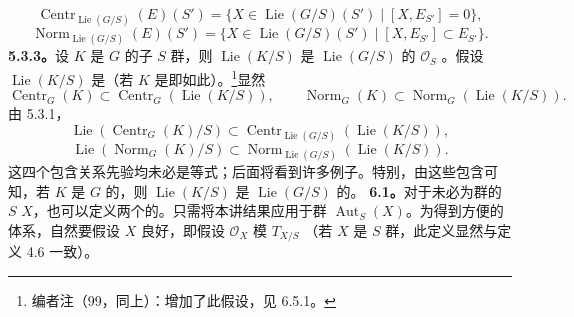 \[\operatorname{Centr}_{\operatorname{Lie}(G/S)}(E)(S')=\{X\in\operatorname{Lie}(G/S)(S')\mid[X,E_{S'}]=0\},\]
\[\operatorname{Norm}_{\operatorname{Lie}(G/S)}(E)(S')=\{X\in\operatorname{Lie}(G/S)(S')\mid[X,E_{S'}]\subset E_{S'}\}.\]
\textbf{5.3.3。}设 $K$ 是 $G$ 的子 $S$ 群，则 $\operatorname{Lie}(K/S)$ 是 $\operatorname{Lie}(G/S)$ 的 $\mathcal O_S$ 。假设 $\operatorname{Lie}(K/S)$ 是（若 $K$ 是即如此）。\footnote{编者注（99，同上）：增加了此假设，见 6.5.1。}显然
\[\operatorname{Centr}_G(K)\subset\operatorname{Centr}_G(\operatorname{Lie}(K/S)),\qquad\operatorname{Norm}_G(K)\subset\operatorname{Norm}_G(\operatorname{Lie}(K/S)).\]
由 5.3.1，
\[\operatorname{Lie}(\operatorname{Centr}_G(K)/S)\subset\operatorname{Centr}_{\operatorname{Lie}(G/S)}(\operatorname{Lie}(K/S)),\]
\[\operatorname{Lie}(\operatorname{Norm}_G(K)/S)\subset\operatorname{Norm}_{\operatorname{Lie}(G/S)}(\operatorname{Lie}(K/S)).\]
这四个包含关系先验均未必是等式；后面将看到许多例子。特别，由这些包含可知，若 $K$ 是 $G$ 的，则 $\operatorname{Lie}(K/S)$ 是 $\operatorname{Lie}(G/S)$ 的。
\textbf{6.1。}对于未必为群的 $S$  $X$，也可以定义两个的。只需将本讲结果应用于群 $\operatorname{Aut}_S(X)$。为得到方便的体系，自然要假设 $X$ 良好，即假设 $\mathcal O_X$ 模 $T_{X/S}$ （若 $X$ 是 $S$ 群，此定义显然与定义 4.6 一致）。

